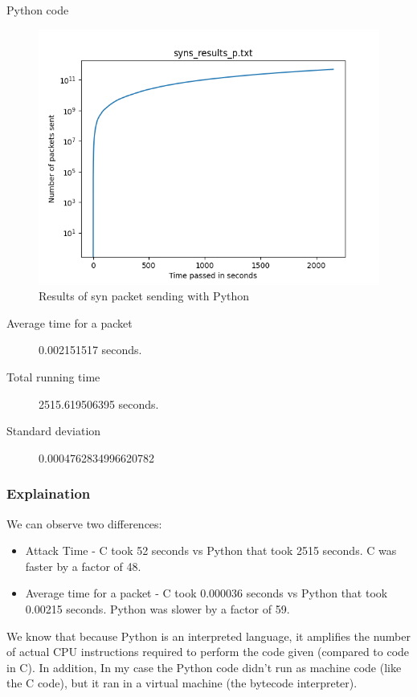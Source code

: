 \documentclass[11pt]{article}
\begin{document}
\begin{description}
\item[{Python code}] 
\end{description}
\begin{figure}[htbp]
\centering
\includegraphics[width=.9\linewidth]{results/Syn_pkts_p.png}
\caption{Results of syn packet sending with Python}
\end{figure}
\begin{description}
\item[{Average time for a packet}] 0.002151517 seconds.
\item[{Total running time}] 2515.619506395 seconds.
\item[{Standard deviation}] 0.0004762834996620782
\end{description}
\subsubsection{Explaination}
\label{sec:org730e790}
We can observe two differences:
\begin{itemize}
\item Attack Time - C took 52 seconds vs Python that took 2515 seconds. C was faster by a factor of 48.
\item Average time for a packet - C took 0.000036 seconds vs Python that took 0.00215 seconds. Python was slower by a factor of 59.
\end{itemize}
We know that because Python is an interpreted language, it amplifies the number of actual CPU instructions required to perform the code given (compared to code in C).
In addition, In my case the Python code didn't run as machine code (like the C code), but it ran in a virtual machine (the bytecode interpreter).
\end{document}
